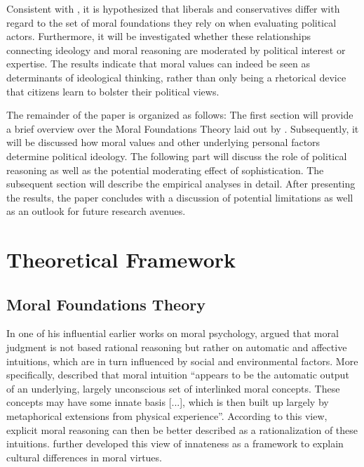 \documentclass[12pt]{paper}
\begin{document}
Consistent with \citet{graham2009liberals}, it is hypothesized that liberals and conservatives differ with regard to the set of moral foundations they rely on when evaluating political actors. Furthermore, it will be investigated whether these relationships connecting ideology and moral reasoning are moderated by political interest or expertise. The results indicate that moral values can indeed be seen as determinants of ideological thinking, rather than only being a rhetorical device that citizens learn to bolster their political views.

The remainder of the paper is organized as follows: The first section will provide a brief overview over the Moral Foundations Theory laid out by \citet{haidt2008moral}. Subsequently, it will be discussed how moral values and other underlying personal factors determine political ideology. The following part will discuss the role of political reasoning as well as the potential moderating effect of sophistication. The subsequent section will describe the empirical analyses in detail. After presenting the results, the paper concludes with a discussion of potential limitations as well as an outlook for future research avenues.


\section{Theoretical Framework}

\subsection{Moral Foundations Theory}

In one of his influential earlier works on moral psychology, \citet{haidt2001emotional} argued that moral judgment is not based rational reasoning but rather on automatic and affective intuitions, which are in turn influenced by social and environmental factors. More specifically, \citet[825]{haidt2001emotional} described that moral intuition ``appears to be the automatic output of an underlying, largely unconscious set of interlinked moral concepts. These concepts may have some innate basis [...], which is then built up largely by metaphorical extensions from physical experience''. According to this view, explicit moral reasoning can then be better described as a rationalization of these intuitions. \citet{haidt2004intuitive} further developed this view of innateness as a framework to explain cultural differences in moral virtues.
\end{document}
